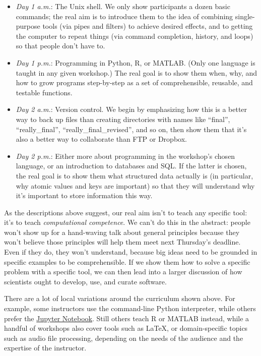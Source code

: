 \documentclass[10pt,a4paper,twocolumn]{article}
\begin{document}
\begin{itemize}
\item
  \emph{Day 1 a.m.}: The Unix shell. We only show participants a dozen
  basic commands; the real aim is to introduce them to the idea of
  combining single-purpose tools (via pipes and filters) to achieve
  desired effects, and to getting the computer to repeat things (via
  command completion, history, and loops) so that people don't have
  to.
\item
  \emph{Day 1 p.m.}: Programming in Python, R, or MATLAB. (Only one
  language is taught in any given workshop.) The real goal is to show
  them when, why, and how to grow programs step-by-step as a set of
  comprehensible, reusable, and testable functions.
\item
  \emph{Day 2 a.m.}: Version control. We begin by emphasizing how this
  is a better way to back up files than creating directories with names
  like ``final'', ``really\_final'', ``really\_final\_revised'', and
  so on, then show them that it's also a better way to collaborate
  than FTP or Dropbox.
\item
  \emph{Day 2 p.m.}: Either more about programming in the workshop's
  chosen language, or an introduction to databases and SQL.  If the
  latter is chosen, the real goal is to show them what structured data
  actually is (in particular, why atomic values and keys are
  important) so that they will understand why it's important to store
  information this way.
\end{itemize}

As the descriptions above suggest, our real aim isn't to teach any
specific tool: it's to teach \emph{computational competence}. We can't
do this in the abstract: people won't show up for a hand-waving talk
about general principles because they won't believe those principles
will help them meet next Thursday's deadline.  Even if they do, they
won't understand, because big ideas need to be grounded in specific
examples to be comprehensible. If we show them how to solve a specific
problem with a specific tool, we can then lead into a larger
discussion of how scientists ought to develop, use, and curate
software.

There are a lot of local variations around the curriculum shown above.
For example, some instructors use the command-line Python interpreter,
while others prefer the \href{https://jupyter.org/}{Jupyter Notebook}.
Still others teach R or MATLAB instead, while a handful of workshops
also cover tools such as LaTeX, or domain-specific topics such as
audio file processing, depending on the needs of the audience and the
expertise of the instructor.
\end{document}
